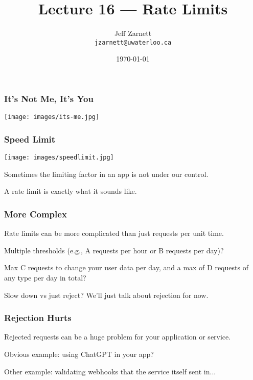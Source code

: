 


\title{Lecture 16 --- Rate Limits}

\author{Jeff Zarnett\\ \small \texttt{jzarnett@uwaterloo.ca}}
\date{\today}




\begin{frame}
  \titlepage
 \end{frame}
 
\begin{frame}
\frametitle{It's Not Me, It's You}

\begin{center}
  \texttt{[image: images/its-me.jpg]}
\end{center}

\end{frame}

\begin{frame}
\frametitle{Speed Limit}

\begin{center}
  \texttt{[image: images/speedlimit.jpg]}
\end{center}

Sometimes the limiting factor in an app is not under our control.

A rate limit is exactly what it sounds like.

\end{frame}

\begin{frame}
\frametitle{More Complex}

Rate limits can be more complicated than just requests per unit time. 

Multiple thresholds (e.g., A requests per hour or B requests per day)?

Max C requests to change your user data per day, and a max of D requests of any type per day in total?

Slow down vs just reject? We'll just talk about rejection for now.

\end{frame}

\begin{frame}
\frametitle{Rejection Hurts}

Rejected requests can be a huge problem for your application or service.

Obvious example: using ChatGPT in your app?

Other example: validating webhooks that the service itself sent in...

\end{frame}


